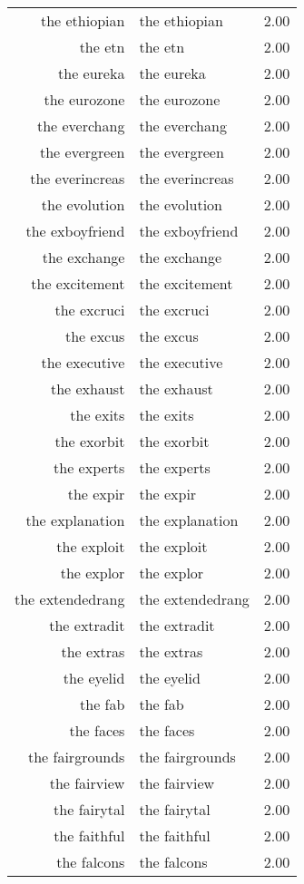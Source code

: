 \begin{table}[ht]
\begin{tabular}{rlr}
  the ethiopian & the ethiopian & 2.00 \\ 
  the etn & the etn & 2.00 \\ 
  the eureka & the eureka & 2.00 \\ 
  the eurozone & the eurozone & 2.00 \\ 
  the everchang & the everchang & 2.00 \\ 
  the evergreen & the evergreen & 2.00 \\ 
  the everincreas & the everincreas & 2.00 \\ 
  the evolution & the evolution & 2.00 \\ 
  the exboyfriend & the exboyfriend & 2.00 \\ 
  the exchange & the exchange & 2.00 \\ 
  the excitement & the excitement & 2.00 \\ 
  the excruci & the excruci & 2.00 \\ 
  the excus & the excus & 2.00 \\ 
  the executive & the executive & 2.00 \\ 
  the exhaust & the exhaust & 2.00 \\ 
  the exits & the exits & 2.00 \\ 
  the exorbit & the exorbit & 2.00 \\ 
  the experts & the experts & 2.00 \\ 
  the expir & the expir & 2.00 \\ 
  the explanation & the explanation & 2.00 \\ 
  the exploit & the exploit & 2.00 \\ 
  the explor & the explor & 2.00 \\ 
  the extendedrang & the extendedrang & 2.00 \\ 
  the extradit & the extradit & 2.00 \\ 
  the extras & the extras & 2.00 \\ 
  the eyelid & the eyelid & 2.00 \\ 
  the fab & the fab & 2.00 \\ 
  the faces & the faces & 2.00 \\ 
  the fairgrounds & the fairgrounds & 2.00 \\ 
  the fairview & the fairview & 2.00 \\ 
  the fairytal & the fairytal & 2.00 \\ 
  the faithful & the faithful & 2.00 \\ 
  the falcons & the falcons & 2.00 \\ 

\end{tabular}
\end{table}
